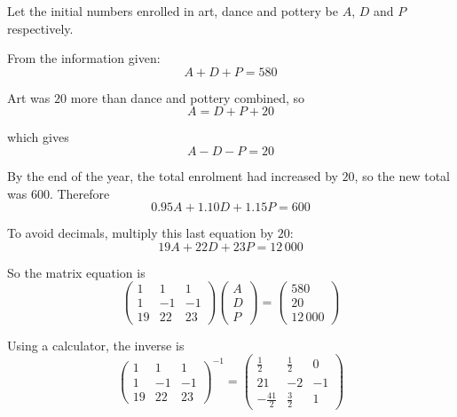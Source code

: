\documentclass[leqno]{article}
\begin{document}
\begin{enumerate}[
  label=\textbf{\arabic*.},
  leftmargin=*,
  topsep=0pt,
  partopsep=0pt,
  parsep=0pt
]
\vspace*{10pt}

\begin{djsSolution}
Let the initial numbers enrolled in art, dance and pottery be \(A\), \(D\) and \(P\) respectively.

From the information given:
\[
A+D+P=580
\]

Art was \(20\) more than dance and pottery combined, so
\[
A=D+P+20
\]

which gives
\[
A-D-P=20
\]

By the end of the year, the total enrolment had increased by \(20\), so the new total was \(600\). Therefore
\[
0.95A+1.10D+1.15P=600
\]

To avoid decimals, multiply this last equation by \(20\):
\[
19A+22D+23P=12\,000
\]

So the matrix equation is
\[
\begin{pmatrix}
1&1&1\\
1&-1&-1\\
19&22&23
\end{pmatrix}
\begin{pmatrix}
A\\
D\\
P
\end{pmatrix}
=
\begin{pmatrix}
580\\
20\\
12\,000
\end{pmatrix}
\]

Using a calculator, the inverse is
\[
\begin{pmatrix}
1&1&1\\
1&-1&-1\\
19&22&23
\end{pmatrix}^{-1} = \begin{pmatrix}
\frac12&\frac12&0\\
21&-2&-1\\
-\frac{41}{2}&\frac32&1
\end{pmatrix}\]


\end{djsSolution}
\end{enumerate}
\end{document}
